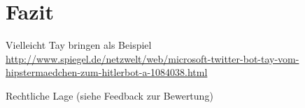 \section{Fazit}

Vielleicht Tay bringen als Beispiel 
\url{http://www.spiegel.de/netzwelt/web/microsoft-twitter-bot-tay-vom-hipstermaedchen-zum-hitlerbot-a-1084038.html}

Rechtliche Lage (siehe Feedback zur Bewertung)
